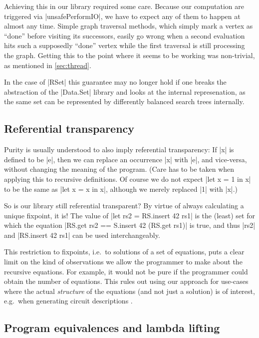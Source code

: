 \documentclass[manuscript,review,screen,acmsmall]{acmart}
\begin{document}
Achieving this in our library required some care. Because our computation are triggered via |unsafePerformIO|, we have to expect any of them to happen at almost any time. Simple graph traversal methods, which simply mark a vertex as “done” before visiting its successors, easily go wrong when a second evaluation hits such a supposedly “done” vertex while the first traversal is still processing the graph. Getting this to the point where it seems to be working was non-trivial, as mentioned in \cref{sec:thread}.

In the case of |RSet| this guarantee may no longer hold if one breaks the abstraction of the |Data.Set| library and looks at the internal represenation, as the same set can be represented by differently balanced search trees internally.

\subsection{Referential transparency}\label{sec:reftrans}

Purity is usually understood to also imply referential transparency: If |x| is defined to be |e|, then we can replace an occurrence |x| with |e|, and vice-versa, without changing the meaning of the program.
(Care has to be taken when applying this to recursive definitions. Of course we do not expect |let x = 1 in x| to be the same as |let x = x in x|, although we merely replaced |1| with |x|.)

So is our library still referential transparent? By virtue of always calculating a unique fixpoint, it is!  The value of |let rs2 = RS.insert 42 rs1| is the (least) set for which the equation |RS.get rs2 == S.insert 42 (RS.get rs1)| is true, and thus |rs2| and |RS.insert 42 rs1| can be used interchangeably.

This restriction to fixpoints, i.e.\ to solutions of a set of equations, puts a clear limit on the kind of observations we allow the programmer to make about the recursive equations. For example, it would not be pure if the programmer could obtain the number of equations. This rules out using our approach for use-cases where the actual \emph{structure} of the equations (and not just a solution) is of interest, e.g.\ when generating circuit descriptions \cite{observable-sharing}.

\subsection{Program equivalences and lambda lifting}\label{sec:sat}
\end{document}
